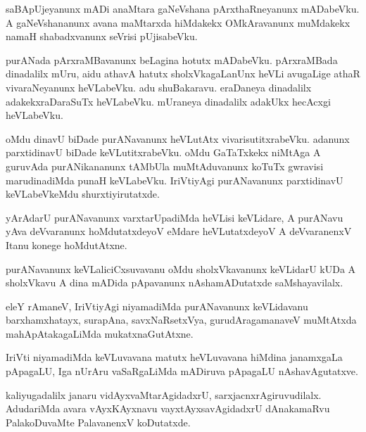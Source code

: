 \documentclass{article}
\begin{document}
\begin{mn}
saBApUjeyanunx  mADi  anaMtara  gaNeVshana  pArxthaRneyanunx  mADabeVku.  A  gaNeVshananunx  avana  
maMtarxda  hiMdakekx  OMkAravanunx  muMdakekx  namaH  shabadxvanunx  seVrisi  pUjisabeVku.
\end{mn}

\begin{mn}
purANada  pArxraMBavanunx  beLagina  hotutx  mADabeVku.  pArxraMBada  dinadalilx  mUru,  aidu  athavA  
hatutx  sholxVkagaLanUnx  heVLi  avugaLige  athaR  vivaraNeyanunx  heVLabeVku.  adu  shuBakaravu.  
eraDaneya  dinadalilx  adakekxraDaraSuTx  heVLabeVku.  mUraneya  dinadalilx  adakUkx  hecAcxgi  heVLabeVku.
\end{mn}

\begin{mn}
oMdu  dinavU  biDade  purANavanunx  heVLutAtx  vivarisutitxrabeVku.  adanunx  parxtidinavU  biDade  keVLutitxrabeVku.  
oMdu  GaTaTxkekx  niMtAga  A  guruvAda  purANikananunx  tAMbUla  muMtAduvanunx  koTuTx  gwravisi  marudinadiMda  
punaH  keVLabeVku.  IriVtiyAgi  purANavanunx  parxtidinavU  keVLabeVkeMdu  shurxtiyirutatxde.
\end{mn}

\begin{mn}
yArAdarU  purANavanunx  varxtarUpadiMda  heVLisi  keVLidare,  A  purANavu  yAva  deVvaranunx  
hoMdutatxdeyoV  eMdare  heVLutatxdeyoV  A  deVvaranenxV  Itanu  konege  hoMdutAtxne.
\end{mn}

\begin{mn}
purANavanunx  keVLaliciCxsuvavanu  oMdu  sholxVkavanunx  keVLidarU  kUDa  A  sholxVkavu  A  dina  
mADida  pApavanunx  nAshamADutatxde  saMshayavilalx. 
\end{mn}

\begin{mn}
eleY  rAmaneV,  IriVtiyAgi  niyamadiMda  purANavanunx  keVLidavanu  barxhamxhatayx,  surapAna,  
savxNaRsetxVya,  gurudAragamanaveV  muMtAtxda  mahApAtakagaLiMda  mukatxnaGutAtxne.
\end{mn}

\begin{mn}
IriVti  niyamadiMda  keVLuvavana  matutx  heVLuvavana  hiMdina  janamxgaLa  pApagaLU,  Iga  nUrAru  
vaSaRgaLiMda  mADiruva  pApagaLU  nAshavAgutatxve.
\end{mn}

\begin{mn}
kaliyugadalilx  janaru  vidAyxvaMtarAgidadxrU,  sarxjacnxrAgiruvudilalx.  AdudariMda  avara  vAyxKAyxnavu  
vayxtAyxsavAgidadxrU  dAnakamaRvu  PalakoDuvaMte  PalavanenxV  koDutatxde.  
\end{mn}
\end{document}
